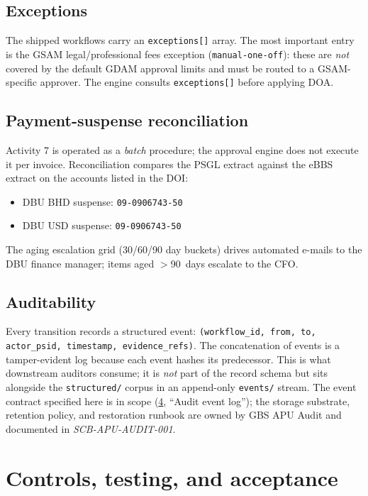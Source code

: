 \documentclass[11pt,a4paper,twoside]{report}
\begin{document}
\section{Exceptions}

The shipped workflows carry an \texttt{exceptions[]} array. The most
important entry is the GSAM legal/professional fees exception
(\texttt{manual-one-off}): these are \emph{not} covered by the default
GDAM approval limits and must be routed to a GSAM-specific approver. The
engine consults \texttt{exceptions[]} before applying DOA.

\section{Payment-suspense reconciliation}

Activity 7 is operated as a \emph{batch} procedure; the approval engine
does not execute it per invoice. Reconciliation compares the PSGL
extract against the eBBS extract on the accounts listed in the DOI:

\begin{itemize}
\item DBU BHD suspense: \texttt{09-0906743-50}
\item DBU USD suspense: \texttt{09-0906743-50}
\end{itemize}

The aging escalation grid (30/60/90 day buckets) drives automated
e-mails to the DBU finance manager; items aged $>$90~days escalate to
the CFO.

\section{Auditability}

Every transition records a structured event:
\texttt{(workflow\_id, from, to, actor\_psid, timestamp, evidence\_refs)}.
The concatenation of events is a tamper-evident log because each event
hashes its predecessor. This is what downstream auditors consume; it
is \emph{not} part of the record schema but sits alongside the
\texttt{structured/} corpus in an append-only \texttt{events/} stream.
The event contract specified here is in scope (\cref{ch:controls},
``Audit event log''); the storage substrate, retention policy, and
restoration runbook are owned by GBS APU Audit and documented in
\emph{SCB-APU-AUDIT-001}.
\chapter{Controls, testing, and acceptance}\label{ch:controls}
\end{document}
